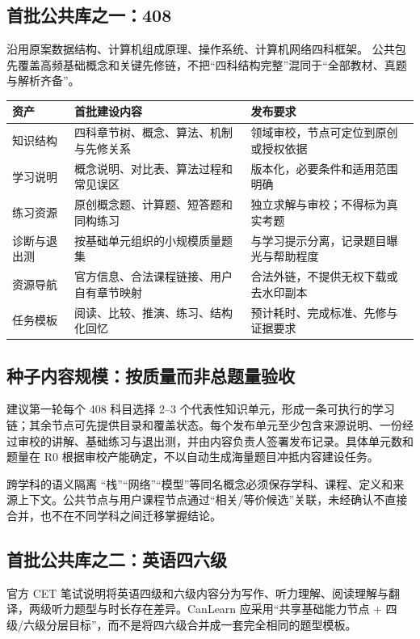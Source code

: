 \documentclass[UTF8,a4paper,11pt,fontset=none]{ctexart}
\newcommand{\cth}[1]{\textbf{\sffamily #1}}
\newcommand{\cont}[1]{\clearpage\noindent{\small\sffamily\color{Muted}#1}\par\vspace{3pt}}
\newenvironment{tbl}{\par\vspace{3pt}\small\noindent\ignorespaces}{\unskip\par\vspace{5pt}}
\begin{document}
\subsection{首批公共库之一：408}
沿用原案数据结构、计算机组成原理、操作系统、计算机网络四科框架。\cite{original} 公共包先覆盖高频基础概念和关键先修链，不把“四科结构完整”混同于“全部教材、真题与解析齐备”。
\begin{tbl}
\begin{tabularx}{\linewidth}{@{}L{26mm}YY@{}}
\toprule
\cth{资产}&\cth{首批建设内容}&\cth{发布要求}\\\midrule
知识结构&四科章节树、概念、算法、机制与先修关系&领域审校，节点可定位到原创或授权依据\\
学习说明&概念说明、对比表、算法过程和常见误区&版本化，必要条件和适用范围明确\\
练习资源&原创概念题、计算题、短答题和同构练习&独立求解与审校；不得标为真实考题\\
诊断与退出测&按基础单元组织的小规模质量题集&与学习提示分离，记录题目曝光与帮助程度\\
资源导航&官方信息、合法课程链接、用户自有章节映射&合法外链，不提供无权下载或去水印副本\\
任务模板&阅读、比较、推演、练习、结构化回忆&预计耗时、完成标准、先修与证据要求\\
\bottomrule
\end{tabularx}
\end{tbl}

\subsection{种子内容规模：按质量而非总题量验收}
建议第一轮每个 408 科目选择 2--3 个代表性知识单元，形成一条可执行的学习链；其余节点可先提供目录和覆盖状态。每个发布单元至少包含来源说明、一份经过审校的讲解、基础练习与退出测，并由内容负责人签署发布记录。具体单元数和题量在 R0 根据审校产能确定，不以自动生成海量题目冲抵内容建设任务。

\begin{insight}{跨学科的语义隔离}
“栈”“网络”“模型”等同名概念必须保存学科、课程、定义和来源上下文。公共节点与用户课程节点通过“相关/等价候选”关联，未经确认不直接合并，也不在不同学科之间迁移掌握结论。
\end{insight}

\cont{7 / 公开知识库与资源建设（续）}
\subsection{首批公共库之二：英语四六级}
官方 CET 笔试说明将英语四级和六级内容分为写作、听力理解、阅读理解与翻译，两级听力题型与时长存在差异。CanLearn 应采用“共享基础能力节点 + 四级/六级分层目标”，而不是将四六级合并成一套完全相同的题型模板。\cite{cet}
\end{document}
